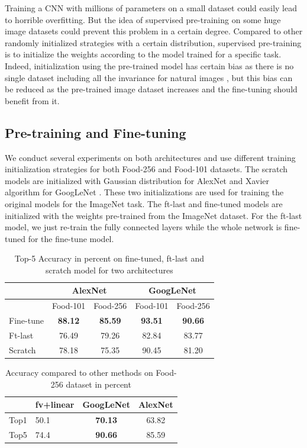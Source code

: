 Training a CNN with millions of parameters on a small dataset could easily lead to horrible overfitting. But the idea of supervised pre-training on some huge image datasets could prevent this problem in a certain degree. Compared to other randomly initialized strategies with a certain distribution, supervised pre-training is to initialize the weights according to the model trained for a specific task. Indeed, initialization using the pre-trained model has certain bias as there is no single dataset including all the invariance for natural images \cite{agrawal2014analyzing}, but this bias can be reduced as the pre-trained image dataset increases and the fine-tuning should benefit from it.
\subsection{Pre-training and Fine-tuning}
We conduct several experiments on both architectures and use different training initialization strategies for both Food-256 and Food-101 datasets. The scratch models are initialized with Gaussian distribution for AlexNet and Xavier algorithm for GoogLeNet%
\cite{glorot2010understanding}. These two initializations are used for training the original models for the ImageNet task. The ft-last and fine-tuned models are initialized with the weights pre-trained from the ImageNet dataset. For the ft-last model, we just re-train the fully connected layers while the whole network is fine-tuned for the fine-tune model.
\begin{table}[htbp]
	\centering
	\caption{Top-5 Accuracy in percent on fine-tuned, ft-last and scratch model for two architectures}
	\begin{tabular}{|l|cc|cc|}
		\hline
		& \multicolumn{2}{c|}{AlexNet} & \multicolumn{2}{c|}{GoogLeNet} \\  \hline 
		& Food-101   & Food-256   & Food-101   & Food-256 \\\hline
		Fine-tune & \textbf{88.12} & \textbf{85.59} & \textbf{93.51} & \textbf{90.66} \\\hline
		Ft-last &76.49    &79.26&    82.84    &83.77\\\hline
		Scratch & 78.18 & 75.35 & 90.45 & 81.20 \\\hline
	\end{tabular}%
	\label{tab:ft}%
\end{table}%


\begin{table}[htbp]
	\centering
	\caption{Accuracy compared to other methods on Food-256 dataset in percent}
	\begin{tabular}{|c|C{3cm}|c|c|}
		\hline
		& fv+linear \cite{Kawano:2014} & GoogLeNet & AlexNet \\\hline
		
		Top1  & 50.1& \textbf{70.13} & 63.82 \\\hline
		Top5  & 74.4  & \textbf{90.66} & 85.59\\\hline
	\end{tabular}%
	\label{tab:256}%
\end{table}%

